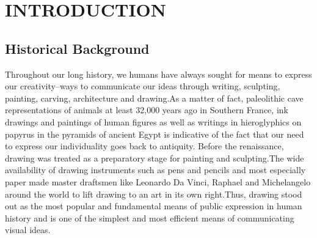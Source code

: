 \chapter{INTRODUCTION} %
\label{Introduction} %

\section{Historical Background}
\hspace{30}Throughout our long history, we humans have always sought for means 
to express our creativity–ways to communicate our ideas through writing, 
sculpting, painting, carving, architecture and drawing.As a matter of fact,
paleolithic cave representations of animals at least 32,000 years ago in  
Southern France, ink drawings and paintings of human figures as well as writings 
in hieroglyphics on papyrus in the pyramids of ancient Egypt is
indicative of the fact that our need to express our individuality goes back to
antiquity. Before the renaissance, drawing was treated as a preparatory stage
for painting and sculpting.The wide availability of drawing instruments such as 
pens and pencils and most especially paper made master draftsmen like
Leonardo Da Vinci, Raphael and Michelangelo around the world to lift drawing
to an art in its own right.Thus, drawing stood out as the most popular and
fundamental means of public expression in human history and is one of the
simplest and most efficient means of communicating visual ideas. \cite{1}\\

